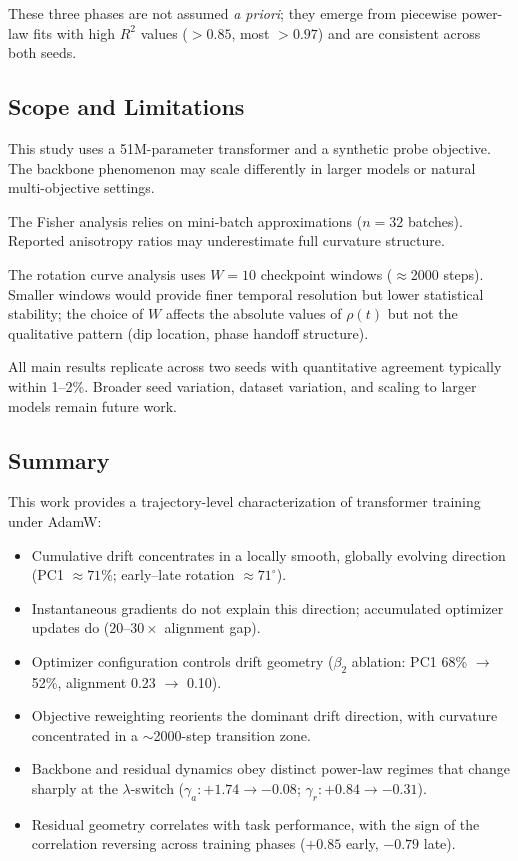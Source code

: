 \documentclass[11pt,a4paper]{article}
\begin{document}
These three phases are not assumed \emph{a priori}; they emerge from piecewise power-law fits with high $R^2$ values ($> 0.85$, most $> 0.97$) and are consistent across both seeds.


\subsection{Scope and Limitations}

This study uses a 51M-parameter transformer and a synthetic probe objective. The backbone phenomenon may scale differently in larger models or natural multi-objective settings.

The Fisher analysis relies on mini-batch approximations ($n = 32$ batches). Reported anisotropy ratios may underestimate full curvature structure.

The rotation curve analysis uses $W = 10$ checkpoint windows ($\approx$2000 steps). Smaller windows would provide finer temporal resolution but lower statistical stability; the choice of $W$ affects the absolute values of $\rho(t)$ but not the qualitative pattern (dip location, phase handoff structure).

All main results replicate across two seeds with quantitative agreement typically within 1--2\%. Broader seed variation, dataset variation, and scaling to larger models remain future work.


\subsection{Summary}

This work provides a trajectory-level characterization of transformer training under AdamW:

\begin{itemize}
\item Cumulative drift concentrates in a locally smooth, globally evolving direction (PC1 $\approx 71\%$; early--late rotation $\approx 71^{\circ}$).
\item Instantaneous gradients do not explain this direction; accumulated optimizer updates do ($20$--$30\times$ alignment gap).
\item Optimizer configuration controls drift geometry ($\beta_2$ ablation: PC1 68\% $\to$ 52\%, alignment 0.23 $\to$ 0.10).
\item Objective reweighting reorients the dominant drift direction, with curvature concentrated in a $\sim$2000-step transition zone.
\item Backbone and residual dynamics obey distinct power-law regimes that change sharply at the $\lambda$-switch ($\gamma_a: +1.74 \to -0.08$; $\gamma_r: +0.84 \to -0.31$).
\item Residual geometry correlates with task performance, with the sign of the correlation reversing across training phases ($+0.85$ early, $-0.79$ late).
\end{itemize}
\end{document}
